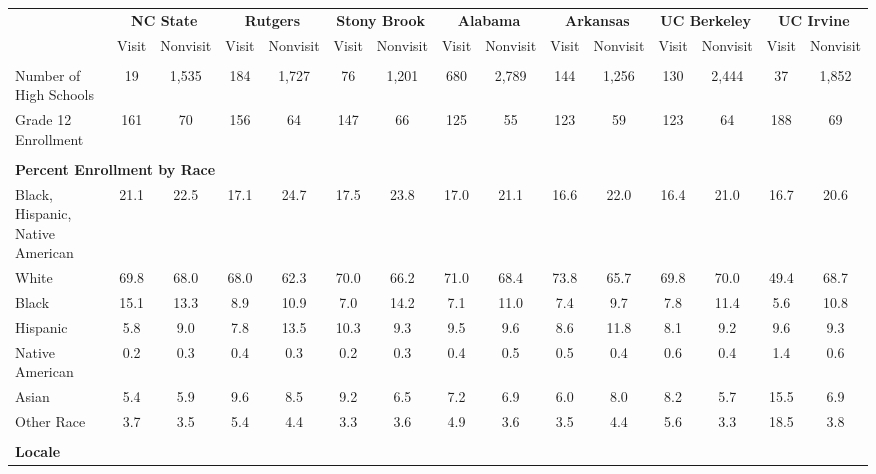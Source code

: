 \begin{tabular*}{\linewidth}{@{\extracolsep{\fill} } lcccccccccccccc}%
&\multicolumn{2}{c}{\bfseries NC State}&\multicolumn{2}{c}{\bfseries Rutgers}&\multicolumn{2}{c}{\bfseries Stony Brook}&\multicolumn{2}{c}{\bfseries Alabama}&\multicolumn{2}{c}{\bfseries Arkansas}&\multicolumn{2}{c}{\bfseries UC Berkeley}&\multicolumn{2}{c}{\bfseries UC Irvine}\\%
&Visit&\multicolumn{1}{l}{Nonvisit}&Visit&\multicolumn{1}{l}{Nonvisit}&Visit&\multicolumn{1}{l}{Nonvisit}&Visit&\multicolumn{1}{l}{Nonvisit}&Visit&\multicolumn{1}{l}{Nonvisit}&Visit&\multicolumn{1}{l}{Nonvisit}&Visit&\multicolumn{1}{l}{Nonvisit}\\%
\hline%
&&&&&&&&&&&&&&\\%
\hspace{0cm}Number of High Schools&19&1,535&184&1,727&76&1,201&680&2,789&144&1,256&130&2,444&37&1,852\\%
\hspace{0cm}Grade 12 Enrollment&161&70&156&64&147&66&125&55&123&59&123&64&188&69\\%
&&&&&&&&&&&&&&\\%
\multicolumn{15}{l}{\bfseries Percent Enrollment by Race}\\%
\hspace{0.2cm}Black, Hispanic, Native American&21.1&22.5&17.1&24.7&17.5&23.8&17.0&21.1&16.6&22.0&16.4&21.0&16.7&20.6\\%
\hspace{0.2cm}White&69.8&68.0&68.0&62.3&70.0&66.2&71.0&68.4&73.8&65.7&69.8&70.0&49.4&68.7\\%
\hspace{0.2cm}Black&15.1&13.3&8.9&10.9&7.0&14.2&7.1&11.0&7.4&9.7&7.8&11.4&5.6&10.8\\%
\hspace{0.2cm}Hispanic&5.8&9.0&7.8&13.5&10.3&9.3&9.5&9.6&8.6&11.8&8.1&9.2&9.6&9.3\\%
\hspace{0.2cm}Native American&0.2&0.3&0.4&0.3&0.2&0.3&0.4&0.5&0.5&0.4&0.6&0.4&1.4&0.6\\%
\hspace{0.2cm}Asian&5.4&5.9&9.6&8.5&9.2&6.5&7.2&6.9&6.0&8.0&8.2&5.7&15.5&6.9\\%
\hspace{0.2cm}Other Race&3.7&3.5&5.4&4.4&3.3&3.6&4.9&3.6&3.5&4.4&5.6&3.3&18.5&3.8\\%
&&&&&&&&&&&&&&\\%
\multicolumn{15}{l}{\bfseries Locale}\\%

\end{tabular*}
